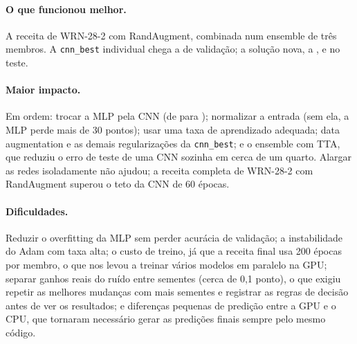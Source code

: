 \documentclass[11pt,a4paper]{article}
\begin{document}
\paragraph{O que funcionou melhor.} A receita de WRN-28-2 com RandAugment, combinada num ensemble de três membros.
A \texttt{cnn\_best} individual chega a \valCnnBest{} de validação; a solução nova, a \valFinal{},
e \testeFinal{} no teste.

\paragraph{Maior impacto.} Em ordem: trocar a MLP pela CNN (de \valMlpMelhor{} para \valCnn{}); normalizar a
entrada (sem ela, a MLP perde mais de 30 pontos); usar uma taxa de aprendizado adequada; data augmentation e as
demais regularizações da \texttt{cnn\_best}; e o ensemble com TTA, que reduziu o erro de teste de uma CNN sozinha
em cerca de um quarto. Alargar as redes isoladamente não ajudou; a receita completa de WRN-28-2 com
RandAugment superou o teto da CNN de 60 épocas.

\paragraph{Dificuldades.} Reduzir o overfitting da MLP sem perder acurácia de validação; a instabilidade do
Adam com taxa alta; o custo de treino, já que a receita final usa 200 épocas por membro, o que nos levou a
treinar vários modelos em paralelo na GPU; separar ganhos reais do ruído entre sementes (cerca de 0,1 ponto), o
que exigiu repetir as melhores mudanças com mais sementes e registrar as regras de decisão antes de ver os
resultados; e diferenças pequenas de predição entre a GPU e o CPU, que tornaram necessário gerar as predições
finais sempre pelo mesmo código.
\end{document}
